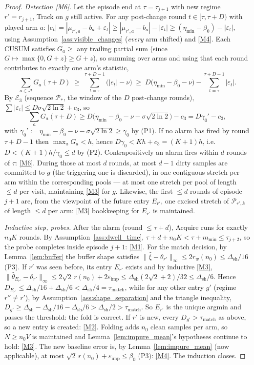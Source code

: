 \documentclass[11pt]{article}
\newcommand{\Acal}{\mathcal A}
\newcommand{\Ecal}{\mathcal E}
\newcommand{\Pcal}{\mathcal P}
\newcommand{\eimp}{\varepsilon_{\mathrm{imp}}}
\newcommand{\dsh}{\Delta_{\mathrm{sh}}}
\newcommand{\taum}{\tau_{\mathrm{match}}}
\begin{document}
\begin{proof}
\emph{Detection \ref{M6}.} Let the episode end at $\tau=\tau_{j+1}$ with new regime $r'=r_{j+1}$, Track on $g$ still active. For any post-change round $t\in[\tau,\tau+D)$ with played arm $a$: $|e_t|=|\mu_{r',a}-b_a+\varepsilon_t|\ge|\mu_{r',a}-b_a|-|\varepsilon_t|\ge(\eta_{\min}-\beta_0)-|\varepsilon_t|$, using Assumption~\ref{ass:visible_changes} (\emph{every} arm shifted) and \ref{M4}. Each CUSUM satisfies $G_a\ge$ any trailing partial sum (since $G\mapsto\max\{0,G+z\}\ge G+z$), so summing over arms and using that each round contributes to exactly one arm's statistic,
\[
\sum_{a\in\Acal}G_a(\tau+D)
\;\ge\;
\sum_{t=\tau}^{\tau+D-1}\bigl(|e_t|-\nu\bigr)
\;\ge\;
D\bigl(\eta_{\min}-\beta_0-\nu\bigr)-\sum_{t=\tau}^{\tau+D-1}|\varepsilon_t| .
\]
By $\Ecal_3$ (sequence $\Pcal_\ast$, the window of the $D$ post-change rounds),
$\sum|\varepsilon_t|\le D\sigma\sqrt{2\ln2}+c_3$, so
\[
\sum_a G_a(\tau+D)
\ge D\bigl(\eta_{\min}-\beta_0-\nu-\sigma\sqrt{2\ln2}\bigr)-c_3
= D\gamma_0'-c_3,
\]
with $\gamma_0':=\eta_{\min}-\beta_0-\nu-\sigma\sqrt{2\ln2}\ge\gamma_0$
by (P1). If no alarm has fired by round $\tau+D-1$ then $\max_aG_a<h$, hence $D\gamma_0<Kh+c_3=(K{+}1)h$, i.e.\ $D<(K{+}1)h/\gamma_0\le d$ by (P2). Contrapositively an alarm fires within $d$ rounds of $\tau$: \ref{M6}. During those at most $d$ rounds, at most $d-1$ dirty samples are committed to $g$ (the triggering one is discarded), in one contiguous stretch per arm within the corresponding pools --- at most one stretch per pool of length $\le d$ per visit, maintaining \ref{M3} for $g$. Likewise, the first $\le d$ rounds of episode $j{+}1$ are, from the viewpoint of the future entry $E_{r'}$, one excised stretch of $\Pcal_{r',k}$ of length $\le d$ per arm: \ref{M3} bookkeeping for $E_{r'}$ is maintained.

\emph{Inductive step, probes.} After the alarm (round $\le\tau+d$), Acquire runs for exactly $n_0K$ rounds. By Assumption~\ref{ass:dwell_time}, $\tau+d+n_0K<\tau+m_{\min}\le\tau_{j+2}$, so the probe completes inside episode $j{+}1$: \ref{M1}. For the match decision, by Lemma~\ref{lem:buffer} the buffer shape satisfies $\|\widehat\xi-\theta_{r'}\|_\infty\le2r_w(n_0)\le\dsh/16$ (P3). If $r'$ was seen before, its entry $E_{r'}$ exists and by inductive \ref{M3},
$\|\widehat\theta_{E_{r'}}-\theta_{r'}\|_\infty\le2\sqrt2\,r(n_0)+2\eimp\le\dsh(2\sqrt2+2)/32\le\dsh/6$.
Hence
$D_{E_{r'}}\le\dsh/16+\dsh/6<\dsh/4=\taum$,
while for any other entry $g'$ (regime $r''\ne r'$), by Assumption~\ref{ass:shape_separation} and the triangle inequality,
$D_{g'}\ge\dsh-\dsh/16-\dsh/6>\dsh/2>\taum$.
So $E_{r'}$ is the unique argmin and passes the threshold: the fold is correct. If $r'$ is new, every $D_{g'}>\taum$ as above, so a new entry is created: \ref{M2}. Folding adds $n_0$ clean samples per arm, so $N\ge n_0V$ is maintained and Lemma~\ref{lem:impure_mean}'s hypotheses continue to hold: \ref{M3}. The new baseline error is, by Lemma~\ref{lem:impure_mean} (now applicable), at most $\sqrt2\,r(n_0)+\eimp\le\beta_0$ (P3): \ref{M4}. The induction closes.
\end{proof}
\end{document}
